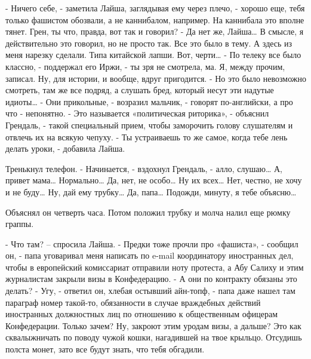 \documentclass{book}
\begin{document}
- Ничего себе, - заметила Лайша, заглядывая ему через плечо, - хорошо еще, тебя только фашистом обозвали, а не каннибалом, например. На каннибала это вполне тянет. Грен, ты что, правда, вот так и говорил?
- Да нет же, Лайша\ldots{} В смысле, я действительно это говорил, но не просто так. Все это было в тему. А здесь из меня нарезку сделали. Типа китайской лапши. Вот, черти\ldots{}
- По телеку все было классно, - поддержал его Иржи, - ты зря не смотрела, ма. Я, между прочим, записал. Ну, для истории, и вообще, вдруг пригодится.
- Но это было невозможно смотреть, там же все подряд, а слушать бред, который несут эти надутые идиоты\ldots{}
- Они прикольные, - возразил мальчик, - говорят по-английски, а про что - непонятно.
- Это называется «политическая риторика», - объяснил Грендаль, - такой специальный прием, чтобы заморочить голову слушателям и отвлечь их на всякую чепуху.
- Ты устраиваешь то же самое, когда тебе лень делать уроки, - добавила Лайша.

Тренькнул телефон.
- Начинается, - вздохнул Грендаль, - алло, слушаю\ldots{} А, привет мама\ldots{} Нормально\ldots{} Да, нет, не особо\ldots{} Ну их всех\ldots{} Нет, честно, не хочу и не буду\ldots{} Ну, дай ему трубку\ldots{} Да, папа\ldots{} Подожди, минуту, я тебе объясню\ldots{}

Объяснял он четверть часа. Потом положил трубку и молча налил еще рюмку граппы.

- Что там? – спросила Лайша.
- Предки тоже прочли про «фашиста», - сообщил он, - папа уговаривал меня написать по e-mail координатору иностранных дел, чтобы в европейский комиссариат отправили ноту протеста, а Абу Салиху и этим журналистам закрыли визы в Конфедерацию.
- А они по контракту обязаны это делать?
- Угу, - ответил он, хлебая остывший айн-топф, - папа даже нашел там параграф номер такой-то, обязанности в случае враждебных действий иностранных должностных лиц по отношению к общественным офицерам Конфедерации. Только зачем? Ну, закроют этим уродам визы, а дальше? Это как сквалыжничать по поводу чужой кошки, нагадившей на твое крыльцо. Отсудишь полста монет, зато все будут знать, что тебя обгадили.
\end{document}
